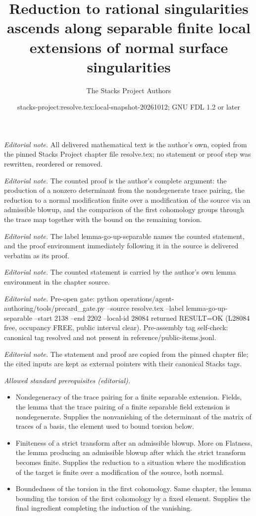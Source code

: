 \documentclass[10pt,a4paper]{amsart}
\title{Reduction to rational singularities ascends along separable finite local extensions of normal surface singularities}
\author{The Stacks Project Authors}
\date{stacks-project:resolve.tex:local-snapshot-20261012; GNU FDL 1.2 or later}
\theoremstyle{plain}
\theoremstyle{definition}
\theoremstyle{remark}
\numberwithin{equation}{subsection}
\begin{document}
\maketitle
\noindent\textit{Editorial note.} All delivered mathematical text is the author's own, copied from the pinned Stacks Project chapter file resolve.tex; no statement or proof step was rewritten, reordered or removed.\par\medskip
\noindent\textit{Editorial note.} The counted proof is the author's complete argument: the production of a nonzero determinant from the nondegenerate trace pairing, the reduction to a normal modification finite over a modification of the source via an admissible blowup, and the comparison of the first cohomology groups through the trace map together with the bound on the remaining torsion.\par\medskip
\noindent\textit{Editorial note.} The label lemma-go-up-separable names the counted statement, and the proof environment immediately following it in the source is delivered verbatim as its proof.\par\medskip
\noindent\textit{Editorial note.} The counted statement is carried by the author's own lemma environment in the chapter source.\par\medskip
\noindent\textit{Editorial note.} Pre-open gate: python operations/agent-authoring/tools/precard\_gate.py --source resolve.tex --label lemma-go-up-separable --start 2138 --end 2202 --local-id 28084 returned RESULT=OK (L28084 free, occupancy FREE, public interval clear). Pre-assembly tag self-check: canonical tag resolved and not present in reference/public-items.jsonl.\par\medskip
\noindent\textit{Editorial note.} The statement and proof are copied from the pinned chapter file; the cited inputs are kept as external pointers with their canonical Stacks tags.\par\medskip
\noindent\textit{Allowed standard prerequisites (editorial).}\begin{itemize}
\item Nondegeneracy of the trace pairing for a finite separable extension. Fields, the lemma that the trace pairing of a finite separable field extension is nondegenerate. Supplies the nonvanishing of the determinant of the matrix of traces of a basis, the element used to bound torsion below.
\item Finiteness of a strict transform after an admissible blowup. More on Flatness, the lemma producing an admissible blowup after which the strict transform becomes finite. Supplies the reduction to a situation where the modification of the target is finite over a modification of the source, both normal.
\item Boundedness of the torsion in the first cohomology. Same chapter, the lemma bounding the torsion of the first cohomology by a fixed element. Supplies the final ingredient completing the induction of the vanishing.
\end{itemize}\medskip
\end{document}

